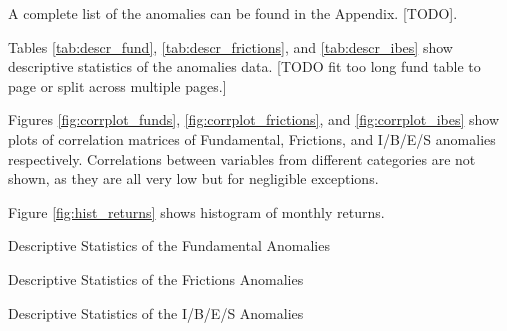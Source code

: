 	A complete list of the anomalies can be found in the Appendix. [TODO]. 
	
	Tables \ref{tab:descr_fund}, \ref{tab:descr_frictions}, and \ref{tab:descr_ibes} show descriptive statistics of the anomalies data. [TODO fit too long fund table to page or split across multiple pages.]
		
	Figures \ref{fig:corrplot_funds}, \ref{fig:corrplot_frictions}, and \ref{fig:corrplot_ibes} show plots of correlation matrices of Fundamental, Frictions, and I/B/E/S anomalies respectively. Correlations between variables from different categories are not shown, as they are all very low but for negligible exceptions. 

	Figure \ref{fig:hist_returns} shows histogram of monthly returns. 
	

	
	\begin{table}
		\resizebox{\textwidth}{!}{}
		\caption{Descriptive Statistics of the Fundamental Anomalies}
		\label{tab:descr_fund}
	\end{table}

	\begin{table}
		\centering
		\resizebox{\textwidth}{!}{}
		\caption{Descriptive Statistics of the Frictions Anomalies}
		\label{tab:descr_frictions}
	\end{table}

	\begin{table}
		\centering
		\resizebox{\textwidth}{!}{}
		\caption{Descriptive Statistics of the I/B/E/S Anomalies}
		\label{tab:descr_ibes}
	\end{table}
	

